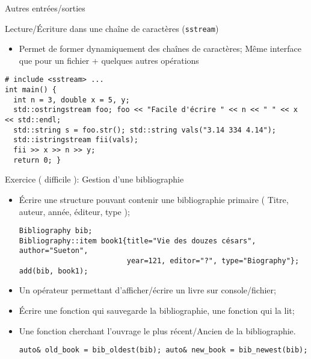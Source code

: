 \documentclass[handout,10pt]{beamer}
\begin{document}
\begin{frame}[fragile]{Autres entrées/sorties}
\tiny
 \begin{block}{Lecture/\'Ecriture dans une chaîne de caractères (\texttt{sstream})}
  \begin{itemize}
   \item Permet de former dynamiquement des chaînes de caractères; Même interface que pour un fichier + quelques autres opérations
  \end{itemize}
\begin{lstlisting}
# include <sstream> ...
int main() {
  int n = 3, double x = 5, y;
  std::ostringstream foo; foo << "Facile d'écrire " << n << " " << x << std::endl;
  std::string s = foo.str(); std::string vals("3.14 334 4.14");
  std::istringstream fii(vals);
  fii >> x >> n >> y;
  return 0; }
\end{lstlisting}
 \end{block}

 \begin{exampleblock}{Exercice ( \alert{difficile} ): Gestion d'une bibliographie}
  \begin{itemize}
   \item \'Ecrire une structure pouvant contenir une bibliographie primaire ( Titre, auteur, année, éditeur, type );   
\begin{lstlisting}
Bibliography bib;
Bibliography::item book1{title="Vie des douzes césars", author="Sueton", 
                         year=121, editor="?", type="Biography"};
add(bib, book1);
\end{lstlisting}
  \item Un opérateur permettant d'afficher/écrire un livre sur console/fichier;
  \item \'Ecrire une fonction qui sauvegarde la bibliographie, une fonction qui la lit;
  \item Une fonction cherchant l'ouvrage le plus récent/Ancien de la bibliographie.
\begin{lstlisting}
auto& old_book = bib_oldest(bib); auto& new_book = bib_newest(bib);
\end{lstlisting}
\end{itemize}
 \end{exampleblock}
 
\end{frame}
\end{document}
